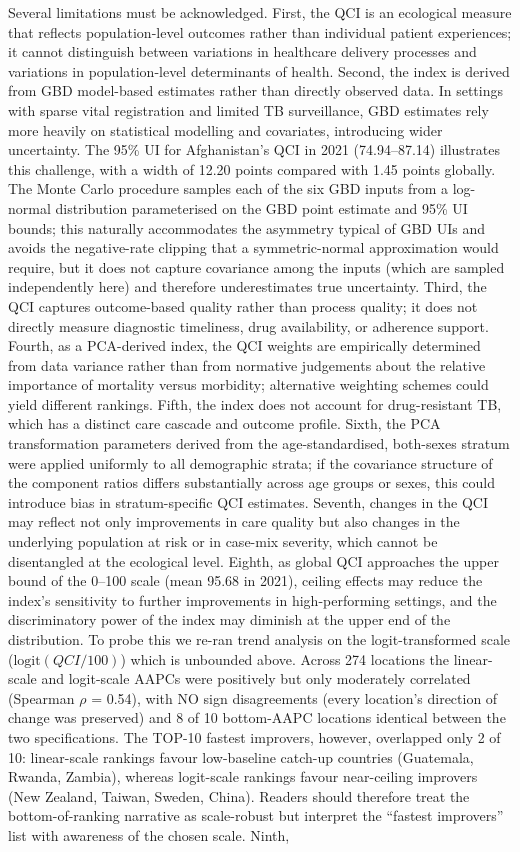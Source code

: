 \documentclass[12pt]{article}
\begin{document}
Several limitations must be acknowledged. First, the QCI is an ecological measure that reflects population-level outcomes rather than individual patient experiences; it cannot distinguish between variations in healthcare delivery processes and variations in population-level determinants of health. Second, the index is derived from GBD model-based estimates rather than directly observed data. In settings with sparse vital registration and limited TB surveillance, GBD estimates rely more heavily on statistical modelling and covariates, introducing wider uncertainty. The 95\% UI for Afghanistan's QCI in 2021 (74.94--87.14) illustrates this challenge, with a width of 12.20 points compared with 1.45 points globally. The Monte Carlo procedure samples each of the six GBD inputs from a log-normal distribution parameterised on the GBD point estimate and 95\% UI bounds; this naturally accommodates the asymmetry typical of GBD UIs and avoids the negative-rate clipping that a symmetric-normal approximation would require, but it does not capture covariance among the inputs (which are sampled independently here) and therefore underestimates true uncertainty. Third, the QCI captures outcome-based quality rather than process quality; it does not directly measure diagnostic timeliness, drug availability, or adherence support. Fourth, as a PCA-derived index, the QCI weights are empirically determined from data variance rather than from normative judgements about the relative importance of mortality versus morbidity; alternative weighting schemes could yield different rankings. Fifth, the index does not account for drug-resistant TB, which has a distinct care cascade and outcome profile. Sixth, the PCA transformation parameters derived from the age-standardised, both-sexes stratum were applied uniformly to all demographic strata; if the covariance structure of the component ratios differs substantially across age groups or sexes, this could introduce bias in stratum-specific QCI estimates. Seventh, changes in the QCI may reflect not only improvements in care quality but also changes in the underlying population at risk or in case-mix severity, which cannot be disentangled at the ecological level. Eighth, as global QCI approaches the upper bound of the 0--100 scale (mean 95.68 in 2021), ceiling effects may reduce the index's sensitivity to further improvements in high-performing settings, and the discriminatory power of the index may diminish at the upper end of the distribution. To probe this we re-ran trend analysis on the logit-transformed scale ($\mathrm{logit}(QCI/100)$) which is unbounded above. Across 274 locations the linear-scale and logit-scale AAPCs were positively but only moderately correlated (Spearman $\rho$ = 0.54), with NO sign disagreements (every location's direction of change was preserved) and 8 of 10 bottom-AAPC locations identical between the two specifications. The TOP-10 fastest improvers, however, overlapped only 2 of 10: linear-scale rankings favour low-baseline catch-up countries (Guatemala, Rwanda, Zambia), whereas logit-scale rankings favour near-ceiling improvers (New Zealand, Taiwan, Sweden, China). Readers should therefore treat the bottom-of-ranking narrative as scale-robust but interpret the ``fastest improvers'' list with awareness of the chosen scale. Ninth, 
\end{document}
